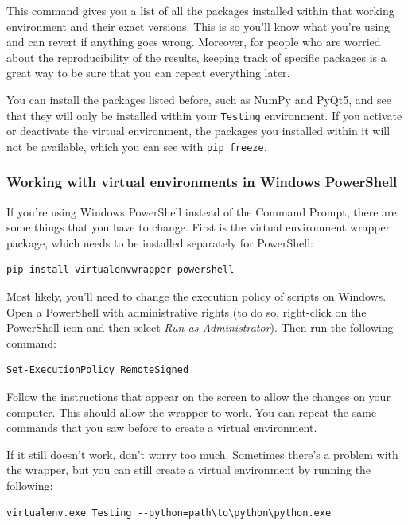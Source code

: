 This command gives you a list of all the packages installed within that working environment and their exact versions. This is so you'll know what you're using and can revert if anything goes wrong. Moreover, for people who are worried about the reproducibility of the results, keeping track of specific packages is a great way to be sure that you can repeat everything later.

You can install the packages listed before, such as NumPy and PyQt5, and see that they will only be installed within your \texttt{Testing} environment. If you activate or deactivate the virtual environment, the packages you installed within it will not be available, which you can see with \texttt{pip freeze}.

\subsubsection{Working with virtual environments in Windows PowerShell}
If you're using Windows PowerShell instead of the Command Prompt, there are some things that you have to change. First is the virtual environment wrapper package, which needs to be installed separately for PowerShell:

\begin{verbatim}
pip install virtualenvwrapper-powershell
\end{verbatim}

Most likely, you'll need to change the execution policy of scripts on Windows. Open a PowerShell with administrative rights (to do so, right-click on the PowerShell icon and then select \emph{Run as Administrator}). Then run the following command:

\begin{verbatim}
Set-ExecutionPolicy RemoteSigned
\end{verbatim}

Follow the instructions that appear on the screen to allow the changes on your computer. This should allow the wrapper to work. You can repeat the same commands that you saw before to create a virtual environment.

If it still doesn't work, don't worry too much. Sometimes there's a problem with the wrapper, but you can still create a virtual environment by running the following:

\begin{verbatim}
virtualenv.exe Testing --python=path\to\python\python.exe
\end{verbatim}

